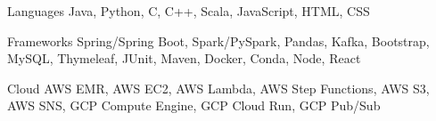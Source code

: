 
\begin{cvskills}
  \cvskill
    {Languages} %
    {Java, Python, C, C++, Scala, JavaScript, HTML, CSS} %

  \cvskill
    {Frameworks} %
    {Spring/Spring Boot, Spark/PySpark, Pandas, Kafka, Bootstrap, MySQL, Thymeleaf, JUnit, Maven, Docker, Conda, Node, React} %
    
  \cvskill
    {Cloud} %
    {AWS EMR, AWS EC2, AWS Lambda, AWS Step Functions, AWS S3, AWS SNS, GCP Compute Engine, GCP Cloud Run, GCP Pub/Sub} %
\end{cvskills}
